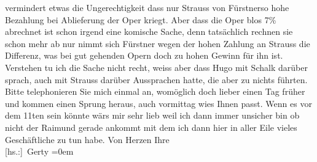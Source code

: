\begin{ledgroupsized}[t]{13cm}
                    vermindert etwas die Ungerechtigkeit dass nur Strauss von Fürstnerso hohe Bezahlung bei Ablieferung der Oper
                    kriegt. Aber dass die Oper blos 7{\%} abrechnet ist schon
                    irgend eine komische Sache, denn tatsächlich rechnen sie schon mehr ab nur nimmt
                    sich Fürstner wegen der hohen Zahlung an Strauss die Differenz, was bei gut gehenden
                    Opern doch zu hohen Gewinn für ihn ist. Verstehen tu ich die Sache nicht recht,
                    weiss aber dass Hugo mit Schalk darüber sprach, auch mit Strauss darüber Aussprachen hatte, die aber zu nichts
                    führten.\pend
           \pstart
           Bitte telephonieren Sie mich einmal an, womöglich doch lieber einen Tag früher
                    und kommen einen Sprung heraus, auch vormittag wies Ihnen passt.\pend
           \pstart
           Wenn es vor dem 11ten{ }sein könnte wärs mir sehr lieb weil ich dann
                    immer unsicher bin ob nicht der Raimund
                    gerade ankommt mit dem ich dann hier in aller Eile vieles Geschäftliche zu tun
                    habe.\pend
           \pstart
           Von Herzen Ihre{\\[\baselineskip]}\spacefill\mbox{{[}hs.:{]} Gerty}\pend
           \leftskip=0em{}          \endnumbering{}\end{ledgroupsized}  \newcommand{\dateiname}{L02544}\newcommand{\titel}{Gerty von Hofmannsthal an Arthur Schnitzler, [5. 3. 1931]}\newcommand{\editorInnen}{Martin Anton Müller und Gerd-Hermann Susen}
            \footnotesize
\begin{ledgroupsized}[t]{11.5cm}
\end{ledgroupsized}
         
      